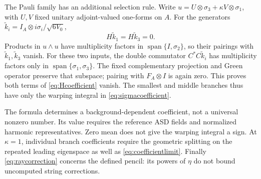 The Pauli family has an additional selection rule. Write
$u=U\otimes\sigma_3+\kappa V\otimes\sigma_1$, with $U,V$
fixed unitary adjoint-valued one-forms on $A$. For the generators
$\widetilde k_i=I_A\otimes i\sigma_i/\sqrt{6V_0}$,
\begin{equation}\label{eq:selectionrule}
 H\widetilde k_1=H\widetilde k_3=0.
\end{equation}
Products in $u\wedge u$ have multiplicity factors in
$\operatorname{span}\{I,\sigma_2\}$, so their pairings with
$\widetilde k_1,\widetilde k_3$ vanish. For these two inputs,
the double commutator $C^*C\widetilde k_i$ has multiplicity
factors only in $\operatorname{span}\{\sigma_1,\sigma_3\}$.
The fixed complementary projection and Green operator preserve
that subspace; pairing with $F_A\otimes I$ is again zero.
This proves both terms of \eqref{eq:Hcoefficient} vanish.
The smallest and middle branches thus have only the warping
integral in \eqref{eq:sigmacoefficient}.

The formula determines a background-dependent coefficient, not
a universal nonzero number. Its value requires the reference ASD
fields and normalized harmonic representatives. Zero mean does
not give the warping integral a sign. At $\kappa=1$, individual
branch coefficients require the geometric splitting on the
repeated leading eigenspace as well as \eqref{eq:coefficientlimit}.
Finally \eqref{eq:raycorrection} concerns the defined pencil:
its powers of $\eta$ do not bound uncomputed string corrections.
